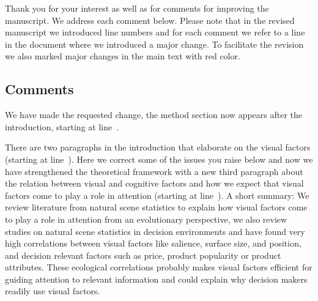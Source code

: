 
Thank you for your interest as well as for comments for improving the manuscript. We address each comment below. Please note that in the revised manuscript we introduced line numbers and for each comment we refer to a line in the document where we introduced a major change. To facilitate the revision we also marked major changes in the main text with red color.


\subsection{Comments}


We have made the requested change, the method section now appears after the introduction, starting at line~.



There are two paragraphs in the introduction that elaborate on the visual factors (starting at line~). Here we correct some of the issues you raise below and now we have strengthened the theoretical framework with a new third paragraph about the relation between visual and cognitive factors and how we expect that visual factors come to play a role in attention (starting at line~). A short summary: We review literature from natural scene statistics to explain how visual factors come to play a role in attention from an evolutionary perspective, we also review studies on natural scene statistics in decision environments and have found very high correlations between visual factors like salience, surface size, and position, and decision relevant factors such as price, product popularity or product attributes. These ecological correlations probably makes visual factors efficient for guiding attention to relevant information and could explain why decision makers readily use visual factors.   


